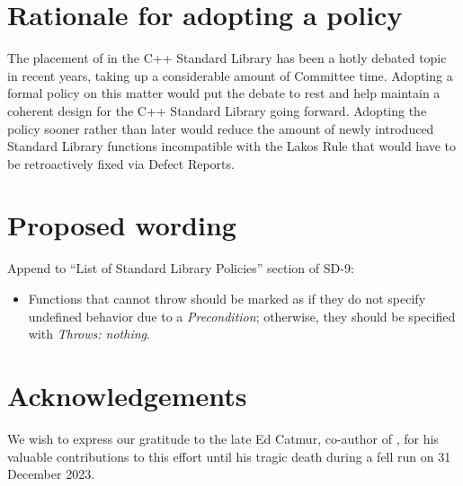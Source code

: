 
\section{Rationale for adopting a policy}
\label{sec:rationale_adopt}

The placement of  in the C++ Standard Library has been a hotly debated topic in recent years, taking up a considerable amount of Committee time. Adopting a formal policy on this matter would put the debate to rest and help maintain a coherent design for the C++ Standard Library going forward. Adopting the policy sooner rather than later would reduce the amount of newly introduced Standard Library functions incompatible with the Lakos Rule that would have to be retroactively fixed via Defect Reports. 


\section{Proposed wording}
\label{sec:wording}

Append to ``List of Standard Library Policies'' section of SD-9:

\begin{addedblock}
\begin{itemize}
\item Functions that cannot throw should be marked as  if they do not specify undefined behavior due to a \emph{Precondition}; otherwise, they should be specified with \emph{Throws: nothing}.
\end{itemize}
\end{addedblock}


\section*{Acknowledgements}
We wish to express our gratitude to the late Ed Catmur, co-author of \cite{P2831R0}, for his valuable contributions to this effort until his tragic death during a fell run on 31 December 2023.


\pagebreak %

\renewcommand{\bibname}{References}




